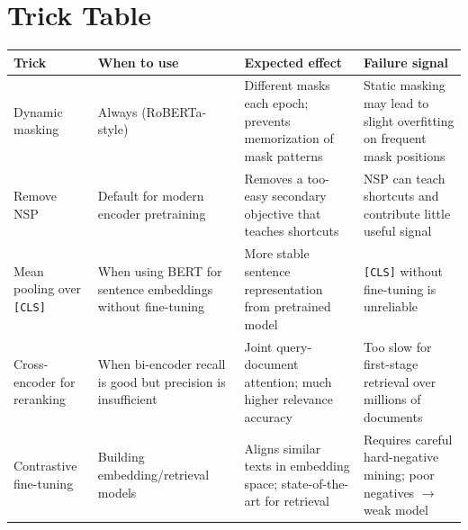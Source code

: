 \section{Trick Table}

\noindent
\begin{tabularx}{\textwidth}{@{}>{\raggedright\arraybackslash}p{2.8cm}
                              >{\raggedright\arraybackslash}p{2.8cm}
                              >{\raggedright\arraybackslash}p{3.2cm}
                              X@{}}
\toprule
\textbf{Trick} & \textbf{When to use} & \textbf{Expected effect} & \textbf{Failure signal} \\
\midrule
Dynamic masking &
  Always (RoBERTa-style) &
  Different masks each epoch; prevents memorization of mask patterns &
  Static masking may lead to slight overfitting on frequent mask positions \\[4pt]
Remove NSP &
  Default for modern encoder pretraining &
  Removes a too-easy secondary objective that teaches shortcuts &
  NSP can teach shortcuts and contribute little useful signal \\[4pt]
Mean pooling over \texttt{[CLS]} &
  When using BERT for sentence embeddings without fine-tuning &
  More stable sentence representation from pretrained model &
  \texttt{[CLS]} without fine-tuning is unreliable \\[4pt]
Cross-encoder for reranking &
  When bi-encoder recall is good but precision is insufficient &
  Joint query-document attention; much higher relevance accuracy &
  Too slow for first-stage retrieval over millions of documents \\[4pt]
Contrastive fine-tuning &
  Building embedding/retrieval models &
  Aligns similar texts in embedding space; state-of-the-art for retrieval &
  Requires careful hard-negative mining; poor negatives $\to$ weak model \\
\bottomrule
\end{tabularx}


